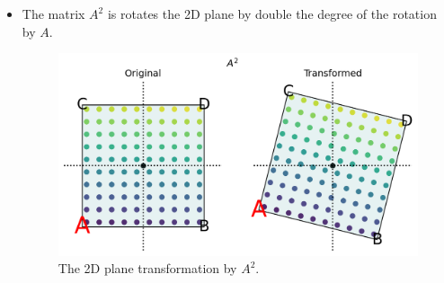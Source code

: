 \documentclass[a4paper, openany]{memoir}
\begin{document}
\begin{itemize}
        \item The matrix $A^2$ is rotates the 2D plane by double the degree of the rotation by $A$.
        \begin{figure}[H]
            \centering
            \includegraphics[scale=0.4]{src/3.23 A^2.png}
            \caption{The 2D plane transformation by $A^2$.}
        \end{figure}
    \end{itemize}
    
\end{document}
